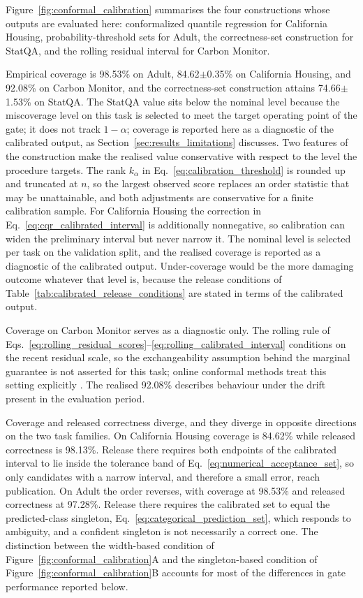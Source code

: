 \documentclass[preprint,12pt,authoryear]{elsarticle}
\begin{document}
Figure~\ref{fig:conformal_calibration} summarises the four constructions whose outputs are evaluated here: conformalized quantile regression for California Housing, probability-threshold sets for Adult, the correctness-set construction for StatQA, and the rolling residual interval for Carbon Monitor.

Empirical coverage is 98.53\% on Adult, 84.62$\pm$0.35\% on California Housing, and 92.08\% on Carbon Monitor, and the correctness-set construction attains 74.66$\pm$1.53\% on StatQA.
The StatQA value sits below the nominal level because the miscoverage level on this task is selected to meet the target operating point of the gate; it does not track $1-\alpha$; coverage is reported here as a diagnostic of the calibrated output, as Section~\ref{sec:results_limitations} discusses.
Two features of the construction make the realised value conservative with respect to the level the procedure targets.
The rank $k_\alpha$ in Eq.~\eqref{eq:calibration_threshold} is rounded up and truncated at $n$, so the largest observed score replaces an order statistic that may be unattainable, and both adjustments are conservative for a finite calibration sample.
For California Housing the correction in Eq.~\eqref{eq:cqr_calibrated_interval} is additionally nonnegative, so calibration can widen the preliminary interval but never narrow it.
The nominal level is selected per task on the validation split, and the realised coverage is reported as a diagnostic of the calibrated output.
Under-coverage would be the more damaging outcome whatever that level is, because the release conditions of Table~\ref{tab:calibrated_release_conditions} are stated in terms of the calibrated output.

Coverage on Carbon Monitor serves as a diagnostic only.
The rolling rule of Eqs.~\eqref{eq:rolling_residual_scores}--\eqref{eq:rolling_calibrated_interval} conditions on the recent residual scale, so the exchangeability assumption behind the marginal guarantee is not asserted for this task; online conformal methods treat this setting explicitly \citep{angelopoulos2024online}.
The realised 92.08\% describes behaviour under the drift present in the evaluation period.

Coverage and released correctness diverge, and they diverge in opposite directions on the two task families.
On California Housing coverage is 84.62\% while released correctness is 98.13\%.
Release there requires both endpoints of the calibrated interval to lie inside the tolerance band of Eq.~\eqref{eq:numerical_acceptance_set}, so only candidates with a narrow interval, and therefore a small error, reach publication.
On Adult the order reverses, with coverage at 98.53\% and released correctness at 97.28\%.
Release there requires the calibrated set to equal the predicted-class singleton, Eq.~\eqref{eq:categorical_prediction_set}, which responds to ambiguity, and a confident singleton is not necessarily a correct one.
The distinction between the width-based condition of Figure~\ref{fig:conformal_calibration}A and the singleton-based condition of Figure~\ref{fig:conformal_calibration}B accounts for most of the differences in gate performance reported below.
\end{document}
